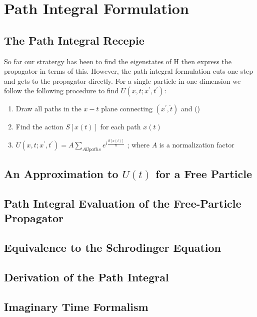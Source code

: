 \chapter{Path Integral Formulation}
\section{The Path Integral Recepie}
So far our stratergy has been to find the eigenstates of H then express the propagator in terms of this. However, the path integral formulation cuts one step and gets to the propagator directly. For a single particle in one dimension we follow the following procedure to find $U(x,t;x^{'}, t^{'})$:
\begin{enumerate}
	\item Draw all paths in the $x-t$ plane connecting $(x^{'}, \dot{t})$ and ()
	\item Find the action $S[x(t)]$ for each path $x(t)$
	\item $U(x,t;x^{'}, t^{'}) = A \sum_{All paths} e^{i\frac{S[x(t)]}{\hbar} }$  ; where $A$ is a normalization factor
\end{enumerate}
\section{An Approximation to $U(t)$ for a Free Particle}

\section{Path Integral Evaluation of the Free-Particle Propagator}

\section{Equivalence to the Schrodinger Equation}

\section{Derivation of the Path Integral}

\section{Imaginary Time Formalism}